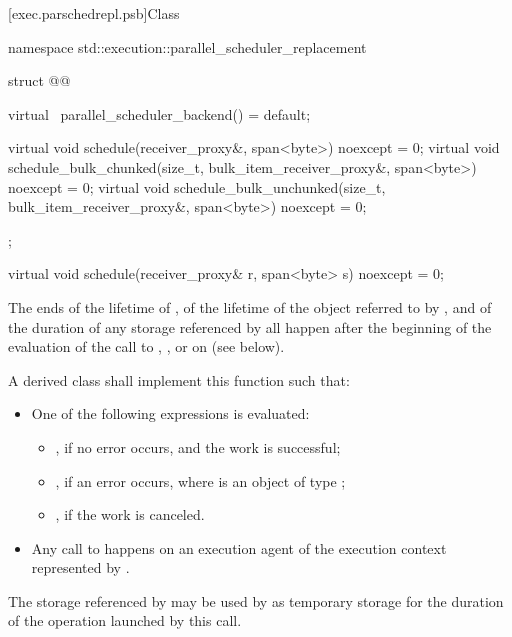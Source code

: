 [exec.parschedrepl.psb]{Class }

\begin{codeblock}
namespace std::execution::parallel_scheduler_replacement {
  struct @@ {
    virtual ~parallel_scheduler_backend() = default;

    virtual void schedule(receiver_proxy&, span<byte>) noexcept = 0;
    virtual void schedule_bulk_chunked(size_t, bulk_item_receiver_proxy&,
                                       span<byte>) noexcept = 0;
    virtual void schedule_bulk_unchunked(size_t, bulk_item_receiver_proxy&,
                                         span<byte>) noexcept = 0;
  };
}
\end{codeblock}

%
\begin{itemdecl}
virtual void schedule(receiver_proxy& r, span<byte> s) noexcept = 0;
\end{itemdecl}

\begin{itemdescr}
\pnum
\expects
The ends
of the lifetime of ,
of the lifetime of the object referred to by , and
of the duration of any storage referenced by 
all happen after
the beginning of the evaluation of
the call to , , or 
on  (see below).

\pnum
\effects
A derived class shall implement this function such that:
\begin{itemize}
\item
One of the following expressions is evaluated:
\begin{itemize}
\item
{}, if no error occurs, and the work is successful;
\item
{}, if an error occurs,
where  is an object of type ;
\item
{}, if the work is canceled.
\end{itemize}
\item
Any call to  happens on
an execution agent of the execution context represented by .
\end{itemize}

\pnum
\remarks
The storage referenced by 
may be used by  as temporary storage
for the duration of the operation launched by this call.
\end{itemdescr}

